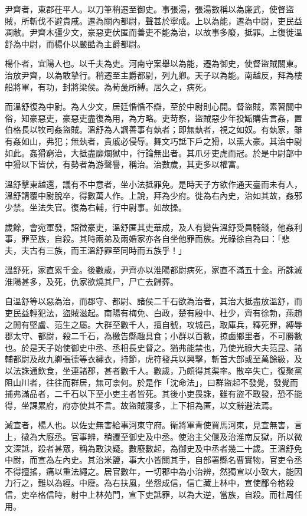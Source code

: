 \begin{pinyinscope}
尹齊者，東郡茌平人。以刀筆稍遷至御史。事張湯，張湯數稱以為廉武，使督盜賊，所斬伐不避貴戚。遷為關內都尉，聲甚於寧成。上以為能，遷為中尉，吏民益凋敝。尹齊木彊少文，豪惡吏伏匿而善吏不能為治，以故事多廢，抵罪。上復徙溫舒為中尉，而楊仆以嚴酷為主爵都尉。

楊仆者，宜陽人也。以千夫為吏。河南守案舉以為能，遷為御史，使督盜賊關東。治放尹齊，以為敢摯行。稍遷至主爵都尉，列九卿。天子以為能。南越反，拜為樓船將軍，有功，封將梁侯。為荀彘所縛。居久之，病死。

而溫舒復為中尉。為人少文，居廷惛惛不辯，至於中尉則心開。督盜賊，素習關中俗，知豪惡吏，豪惡吏盡復為用，為方略。吏苛察，盜賊惡少年投缿購告言姦，置伯格長以牧司姦盜賊。溫舒為人讇善事有埶者；即無埶者，視之如奴。有埶家，雖有姦如山，弗犯；無埶者，貴戚必侵辱。舞文巧詆下戶之猾，以熏大豪。其治中尉如此。姦猾窮治，大抵盡靡爛獄中，行論無出者。其爪牙吏虎而冠。於是中尉部中中猾以下皆伏，有勢者為游聲譽，稱治。治數歲，其吏多以權富。

溫舒擊東越還，議有不中意者，坐小法抵罪免。是時天子方欲作通天臺而未有人，溫舒請覆中尉脫卒，得數萬人作。上說，拜為少府。徙為右內史，治如其故，姦邪少禁。坐法失官。復為右輔，行中尉事。如故操。

歲餘，會宛軍發，詔徵豪吏，溫舒匿其吏華成，及人有變告溫舒受員騎錢，他姦利事，罪至族，自殺。其時兩弟及兩婚家亦各自坐他罪而族。光祿徐自為曰：「悲夫，夫古有三族，而王溫舒罪至同時而五族乎！」

溫舒死，家直累千金。後數歲，尹齊亦以淮陽都尉病死，家直不滿五十金。所誅滅淮陽甚多，及死，仇家欲燒其尸，尸亡去歸葬。

自溫舒等以惡為治，而郡守、都尉、諸侯二千石欲為治者，其治大抵盡放溫舒，而吏民益輕犯法，盜賊滋起。南陽有梅免、白政，楚有殷中、杜少，齊有徐勃，燕趙之閒有堅盧、范生之屬。大群至數千人，擅自號，攻城邑，取庫兵，釋死罪，縛辱郡太守、都尉，殺二千石，為檄告縣趣具食；小群以百數，掠鹵鄉里者，不可勝數也。於是天子始使御史中丞、丞相長史督之。猶弗能禁也，乃使光祿大夫范昆、諸輔都尉及故九卿張德等衣繡衣，持節，虎符發兵以興擊，斬首大部或至萬餘級，及以法誅通飲食，坐連諸郡，甚者數千人。數歲，乃頗得其渠率。散卒失亡，復聚黨阻山川者，往往而群居，無可柰何。於是作「沈命法」，曰群盜起不發覺，發覺而捕弗滿品者，二千石以下至小吏主者皆死。其後小吏畏誅，雖有盜不敢發，恐不能得，坐課累府，府亦使其不言。故盜賊寖多，上下相為匿，以文辭避法焉。

減宣者，楊人也。以佐史無害給事河東守府。衛將軍青使買馬河東，見宣無害，言上，徵為大廐丞。官事辨，稍遷至御史及中丞。使治主父偃及治淮南反獄，所以微文深詆，殺者甚眾，稱為敢決疑。數廢數起，為御史及中丞者幾二十歲。王溫舒免中尉，而宣為左內史。其治米鹽，事大小皆關其手，自部署縣名曹實物，官吏令丞不得擅搖，痛以重法繩之。居官數年，一切郡中為小治辨，然獨宣以小致大，能因力行之，難以為經。中廢。為右扶風，坐怨成信，信亡藏上林中，宣使郿令格殺信，吏卒格信時，射中上林苑門，宣下吏詆罪，以為大逆，當族，自殺。而杜周任用。


\end{pinyinscope}
